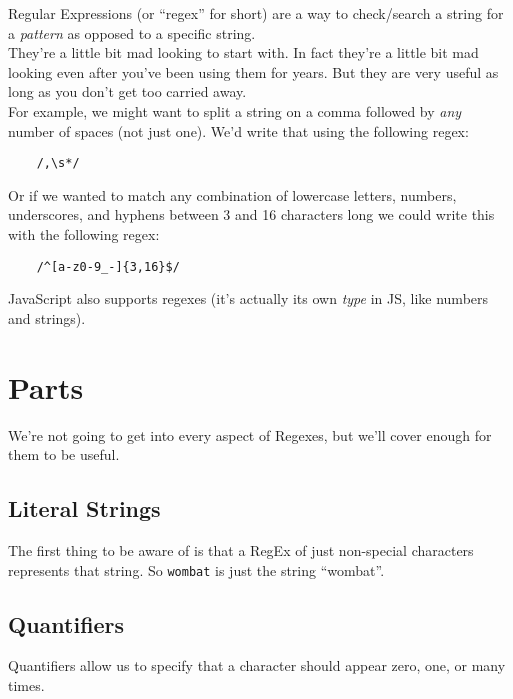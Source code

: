 Regular Expressions (or ``regex'' for short) are a way to check/search a string for a \textit{pattern} as opposed to a specific string.
\\

They're a little bit mad looking to start with. In fact they're a little bit mad looking even after you've been using them for years. But they are very useful as long as you don't get too carried away.
\\

For example, we might want to split a string on a comma followed by \textit{any} number of spaces (not just one). We'd write that using the following regex:

\begin{verbatim}
    /,\s*/
\end{verbatim}


Or if we wanted to match any combination of lowercase letters, numbers, underscores, and hyphens between 3 and 16 characters long we could write this with the following regex:

\begin{verbatim}
    /^[a-z0-9_-]{3,16}$/
\end{verbatim}

JavaScript also supports regexes (it's actually its own \textit{type} in JS, like numbers and strings).

\pagebreak


\section{Parts}

We're not going to get into every aspect of Regexes, but we'll cover enough for them to be useful.

\subsection{Literal Strings}

The first thing to be aware of is that a RegEx of just non-special characters represents that string. So \texttt{wombat} is just the string ``wombat''.

\subsection{Quantifiers}

Quantifiers allow us to specify that a character should appear zero, one, or many times.

